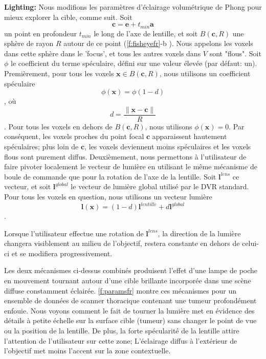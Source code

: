 \par \textbf{Lighting:} Nous modifions les paramètres d'éclairage volumétrique de Phong pour mieux explorer la cible, comme suit. Soit
\begin{equation}
\mathbf{c} = \mathbf{e} + t_{min} \mathbf{a}
\end{equation}
 un point en profondeur $t_{min} $ le long de l'axe de lentille, et soit $ B(\mathbf{c}, R) $ une sphère de rayon $ R $ autour de ce point (\autoref{f:fisheyefr}-b ). Nous appelons les voxels dans cette sphère dans le 'focus', et tous les autres voxels dans $ V $ sont "flous". Soit $ \phi $ le coefficient du terme spéculaire, défini sur une valeur élevée (par défaut: un).
Premièrement, pour tous les voxels $ \mathbf{x} \in B (\mathbf{c}, R) $, nous utilisons un coefficient spéculaire
\begin{equation}
\phi(\mathbf{x}) = \phi (1-d)
\end{equation}
, où
\begin{equation}
 d = \frac{\| \mathbf{x} - \mathbf{c} \|}{R}
\end{equation}.
Pour tous les voxels en dehors de $ B (\mathbf {c}, R) $, nous utilisons $ \phi (\mathbf{x}) = 0 $. Par conséquent, les voxels proches du point focal $ \mathbf{c} $ apparaissent hautement spéculaires; plus loin de $ \mathbf{c} $, les voxels deviennent moins spéculaires et les voxels flous sont purement diffus. Deuxièmement, nous permettons à l'utilisateur de faire pivoter localement le vecteur de lumière en utilisant le même mécanisme de boule de commande que pour la rotation de l'axe de la lentille. Soit $ \mathbf{l}^{lens} $ ce vecteur, et soit $ \mathbf{l}^{global} $ le vecteur de lumière global utilisé par le DVR standard. Pour tous les voxels en question, nous utilisons un vecteur lumière
\begin{equation}
\mathbf{l}(\mathbf{x}) = (1 - d) \mathbf{l}^{lentille} + d \mathbf{l}^{global}
\end{equation}.
 
  Lorsque l'utilisateur effectue une rotation de $\mathbf{l}^{lens} $, la direction de la lumière changera visiblement au milieu de l'objectif, restera constante en dehors de celui-ci et se modifiera progressivement.


Les deux mécanismes ci-dessus combinés produisent l'effet d'une lampe de poche en mouvement tournant autour d'une cible brillante incorporée dans une scène diffuse constamment éclairée. \autoref{f:paramsfr} montre ces mécanismes pour un ensemble de données de scanner thoracique contenant une tumeur profondément enfouie. Nous voyons comment le fait de tourner la lumière met en évidence des détails à petite échelle sur la surface cible (tumeur) sans changer le point de vue ou la position de la lentille. De plus, la forte spécularité de la lentille attire l’attention de l’utilisateur sur cette zone; L'éclairage diffus à l'extérieur de l'objectif met moins l'accent sur la zone contextuelle.

